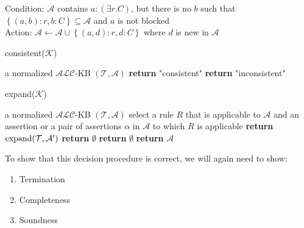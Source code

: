 \begin{mdframed}[frametitle= The modified $\exists$-rule]
	Condition: $\mathcal{A}$ contains $a:(\exists r.C)$, but there is no $b$ such that \\$\left\{ (a,b) :r, b:C \right\} \subseteq \mathcal{A}$ and $a$ is not blocked \\
	Action: $\mathcal{A} \leftarrow \mathcal{A} \cup \left\{ (a,d):r, d:C \right\} $ where $d$ is new in $\mathcal{A}$
\end{mdframed}
\begin{definition}
	\begin{algorithm}[H]
		\caption{consistent($\mathcal{K}$)}
		\label{alg:kb consistent}
		\begin{algorithmic}[1]
			\Require a normalized $\mathcal{ALC}$-KB $(\mathcal{T},\mathcal{A})$
				\State \textbf{return} "consistent"
			\Else{}
				\State \textbf{return} "inconsistent"
			\EndIf
		\end{algorithmic}
	\end{algorithm}
	\begin{algorithm}[H]
		\caption{expand($\mathcal{K}$)}
		\label{alg:kb expand}
		\begin{algorithmic}[1]
			\Require a normalized $\mathcal{ALC}$-KB $(\mathcal{T},\mathcal{A})$
				\State select a rule $R$ that is applicable to $\mathcal{A}$ and an assertion or 
				\State a pair of assertions $\alpha$ in $\mathcal{A}$ to which $R$ is applicable
					\State \textbf{return} $\operatorname{\text{expand}}(\mathcal{T},\mathcal{A}')$
				\Else
						\State \textbf{return} $\emptyset$
				\EndIf
			\Else
					\State \textbf{return} $\emptyset$
				\Else
					\State \textbf{return} $\mathcal{A}$
				\EndIf
			\EndIf
		\end{algorithmic}
	\end{algorithm}
\end{definition}
To show that this decision procedure is correct, we will again need to show:
\begin{enumerate}
	\item Termination
	\item Completeness
	\item Soundness
\end{enumerate}

